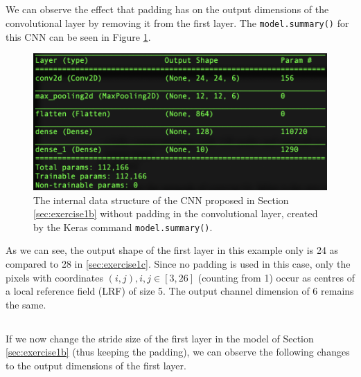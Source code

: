 \documentclass[12pt]{article}
\begin{document}
\subsection{}\label{sec:exercise1d}

We can observe the effect that padding has on the output dimensions of the convolutional layer by removing it from the first layer. The \texttt{model.summary()} for this CNN can be seen in Figure \ref{fig:exercise1d}.

\begin{figure}[ht]
\centering
   \includegraphics[scale=0.7]{graphics/model1d.png}
  \caption{The internal data structure of the CNN proposed in Section \ref{sec:exercise1b} without padding in the convolutional layer, created by the Keras command \texttt{model.summary()}.}
    \label{fig:exercise1d}
\end{figure}

As we can see, the output shape of the first layer in this example only is 24 as compared to 28 in \ref{sec:exercise1c}. Since no padding is used in this case, only the pixels with coordinates $(i,j), i, j \in [3, 26]$ (counting from 1) occur as centres of a local reference field (LRF) of size 5. The output channel dimension of 6 remains the same.


\subsection{}\label{sec:exercise1e}
If we now change the stride size of the first layer in the model of Section \ref{sec:exercise1b} (thus keeping the padding), we can observe the following changes to the output dimensions of the first layer. 
\end{document}
